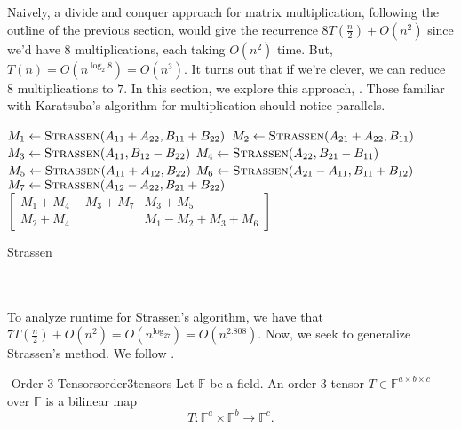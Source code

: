         Naively, a divide and conquer approach for matrix multiplication, following the outline of the previous section, would give the recurrence \(8T\left(\frac{n}{2}\right)+O(n^2)\) since we'd have \(8\) multiplications, each taking \(O(n^2)\) time. But, \(T(n)=O(n^{\log_2 8})=O(n^3)\). It turns out that if we're clever, we can reduce \(8\) multiplications to \(7\). In this section, we explore this approach, \cite{strassen1969gaussian}. Those familiar with Karatsuba's algorithm for multiplication should notice parallels. 
        \begin{algorithm}[H] 
            \begin{algorithmic}[1]
                    \State \(M_1 \gets \Call{Strassen}{A_{11}+A_{22}, B_{11}+B_{22}}\)
                    \State \(M_2 \gets \Call{Strassen}{A_{21}+A_{22}, B_{11}}\)
                    \State \(M_3 \gets \Call{Strassen}{A_{11}, B_{12}-B_{22}}\)
                    \State \(M_4 \gets \Call{Strassen}{A_{22}, B_{21}-B_{11}}\)
                    \State \(M_5 \gets \Call{Strassen}{A_{11}+A_{12}, B_{22}}\)
                    \State \(M_6 \gets \Call{Strassen}{A_{21}-A_{11}, B_{11}+B_{12}}\)
                    \State \(M_7 \gets \Call{Strassen}{A_{12}-A_{22}, B_{21}+B_{22}}\)
                    \State \Return \(\begin{bmatrix} M_1+M_4-M_3+M_7 & M_3+M_5 \\ M_2+M_4 & M_1-M_2+M_3+M_6 \end{bmatrix}\)
                \EndProcedure 
            \end{algorithmic}
            \caption{Strassen}
            \label{alg:strassen}
        \end{algorithm}
        \vphantom
        \\
        \\
        To analyze runtime for Strassen's algorithm, we have that \(7T\left(\frac{n}{2}\right)+O(n^2)=O\left(n^{\log_27}\right)=O\left(n^{2.808}\right)\). Now, we seek to generalize Strassen's method. We follow \cite{alman2021algorithms}.
        \begin{definition}{\Stop\,\,Order \(3\) Tensors}{order3tensors}
            Let \(\mathbb{F}\) be a field. An order \(3\) tensor \(T\in\mathbb{F}^{a\times b\times c}\) over \(\mathbb{F}\) is a bilinear map
            \begin{equation*}
                T:\mathbb{F}^a\times\mathbb{F}^b\to\mathbb{F}^c.
            \end{equation*}
        \end{definition}
